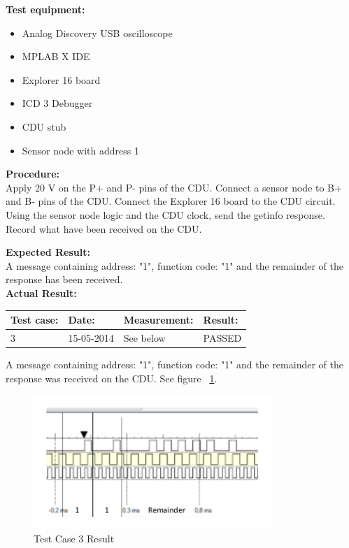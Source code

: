 \textbf{Test equipment:}
\begin{itemize}
\item Analog Discovery USB oscilloscope
\item MPLAB X IDE
\item Explorer 16 board
\item ICD 3 Debugger
\item CDU stub
\item Sensor node with address 1
\end{itemize}

\textbf{Procedure:}\\
Apply 20 V on the P+ and P- pins of the CDU. Connect a sensor node to B+ and B- pins of the CDU. Connect the Explorer 16 board to the CDU circuit. Using the sensor node logic and the CDU clock, send the getinfo response. Record what have been received on the CDU.

\textbf{Expected Result:}\\
A message containing address: "1", function code: "1" and the remainder of the response has been received.\\

\textbf{Actual Result:}\\
\begin{table}[H]
\centering
\begin{tabular}{|p{2cm}|p{2cm}|p{3cm}|p{2cm}|}\hline
\textbf{Test case:} & \textbf{Date:} & \textbf{Measurement:} & \textbf{Result:} \\ \hline
3 & 15-05-2014 & See below & PASSED \\ \hline
\end{tabular}
\end{table}
A message containing address: "1", function code: "1" and the remainder of the response was received on the CDU. See figure ~\ref{fig:InteTestCase3}.
\begin{figure}[H]
\centering
\includegraphics[width=0.8\textwidth]{billeder/intetestcase3}
\caption{Test Case 3 Result}
\label{fig:InteTestCase3}
\end{figure}

